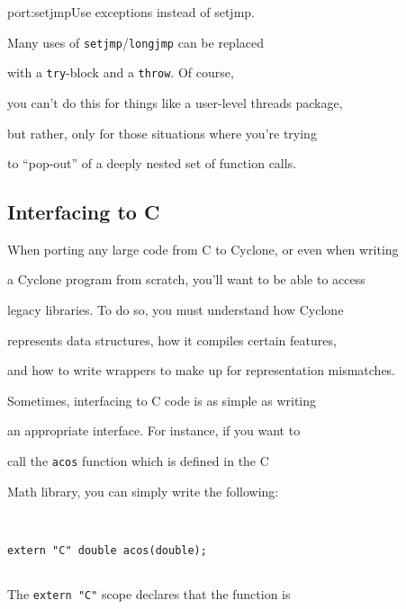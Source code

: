 \begin{porta}{port:setjmp}{Use exceptions instead of setjmp.}





Many uses of \texttt{setjmp}/\texttt{longjmp} can be replaced


with a \texttt{try}-block and a \texttt{throw}.  Of course,


you can't do this for things like a user-level threads package,


but rather, only for those situations where you're trying


to ``pop-out'' of a deeply nested set of function calls.


\end{porta}





\subsection{Interfacing to C}





When porting any large code from C to Cyclone, or even when writing


a Cyclone program from scratch, you'll want to be able to access


legacy libraries.  To do so, you must understand how Cyclone


represents data structures, how it compiles certain features,


and how to write wrappers to make up for representation mismatches.





Sometimes, interfacing to C code is as simple as writing


an appropriate interface.  For instance, if you want to


call the \texttt{acos} function which is defined in the C


Math library, you can simply write the following:


\begin{verbatim}


extern "C" double acos(double);


\end{verbatim}


The \texttt{extern "C"} scope declares that the function is


